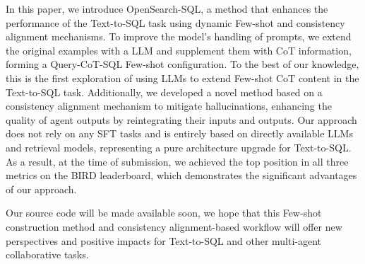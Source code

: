 In this paper, we introduce OpenSearch-SQL, a method that enhances the performance of the Text-to-SQL task using dynamic Few-shot and consistency alignment mechanisms. To improve the model's handling of prompts, we extend the original examples with a LLM and supplement them with CoT information, forming a Query-CoT-SQL Few-shot configuration. To the best of our knowledge, this is the first exploration of using LLMs to extend Few-shot CoT content in the Text-to-SQL task. Additionally, we developed a novel method based on a consistency alignment mechanism to mitigate hallucinations, enhancing the quality of agent outputs by reintegrating their inputs and outputs. Our approach does not rely on any SFT tasks and is entirely based on directly available LLMs and retrieval models, representing a pure architecture upgrade for Text-to-SQL. As a result, at the time of submission, we achieved the top position in all three metrics on the BIRD leaderboard, which demonstrates the significant advantages of our approach.

Our source code will be made available soon, we hope that this Few-shot construction method and consistency alignment-based workflow will offer new perspectives and positive impacts for Text-to-SQL and other multi-agent collaborative tasks.